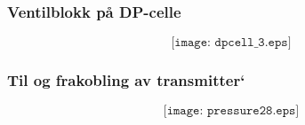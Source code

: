 \documentclass[aspectratio=169,xcolor=dvipsnames]{beamer}
\begin{document}
%
%
%
%
\begin{frame}
	\frametitle{Ventilblokk på DP-celle}

	$$\texttt{[image: dpcell\_3.eps]}$$
\end{frame}

%
%
%
%
\begin{frame}
	\frametitle{Til og frakobling av transmitter`}

	$$\texttt{[image: pressure28.eps]}$$
\end{frame}
\end{document}
